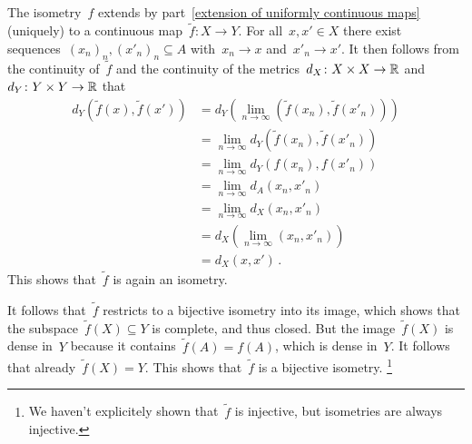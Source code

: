 \subsection{}

The isometry~$f$ extends by part~\ref{extension of uniformly continuous maps} (uniquely) to a continuous map~$\tilde{f} \colon X \to Y$.
For all~$x, x' \in X$ there exist sequences~$(x_n)_n, (x'_n)_n \subseteq A$ with~$x_n \to x$ and~$x'_n \to x'$.
It then follows from the continuity of~$\tilde{f}$ and the continuity of the metrics~$d_X \colon X \times X \to \mathbb{R}$ and~$d_Y \colon Y \times Y \to \mathbb{R}$ that
\begin{align*}
      d_Y(\tilde{f}(x), \tilde{f}(x'))
  &=  d_Y\left( \lim_{n \to \infty} (\tilde{f}(x_n), \tilde{f}(x'_n)) \right) \\
  &=  \lim_{n \to \infty} d_Y(\tilde{f}(x_n), \tilde{f}(x'_n))  \\
  &=  \lim_{n \to \infty} d_Y(f(x_n), f(x'_n))  \\
  &=  \lim_{n \to \infty} d_A(x_n, x'_n)  \\
  &=  \lim_{n \to \infty} d_X(x_n, x'_n)  \\
  &=  d_X\left( \lim_{n \to \infty} (x_n, x'_n) \right) \\
  &=  d_X(x, x') \,.
\end{align*}
This shows that~$\tilde{f}$ is again an isometry.

It follows that~$\tilde{f}$ restricts to a bijective isometry into its image, which shows that the subspace~$\tilde{f}(X) \subseteq Y$ is complete, and thus closed.
But the image~$\tilde{f}(X)$ is dense in~$Y$ because it contains~$\tilde{f}(A) = f(A)$, which is dense in~$Y$.
It follows that already~$\tilde{f}(X) = Y$.
This shows that~$\tilde{f}$ is a bijective isometry.%
\footnote{We haven’t explicitely shown that~$\tilde{f}$ is injective, but isometries are always injective.}





